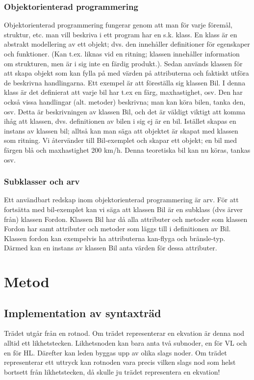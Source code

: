 \documentclass[12pt,a4paper]{article}
\begin{document}
\subsubsection{Objektorienterad programmering}
\label{subsubsection:oop}
Objektorienterad programmering fungerar genom att man för varje föremål, struktur, etc. man vill beskriva i ett program har en s.k. klass. En klass är en abstrakt modellering av ett objekt; dvs. den innehåller definitioner för egenskaper och funktioner. (Kan t.ex. liknas vid en ritning; klassen innehåller information om strukturen, men är i sig inte en färdig produkt.). Sedan används klassen för att skapa objekt som kan fylla på med värden på attributerna och faktiskt utföra de beskrivna handlingarna. Ett exempel är att föreställa sig klassen Bil. I denna klass är det definierat att varje bil har t.ex en färg, maxhastighet, osv. Den har också vissa handlingar (alt. metoder) beskrivna; man kan köra bilen, tanka den, osv. Detta är beskrivningen av klassen Bil, och det är väldigt viktigt att komma ihåg att klassen, dvs. definitionen av bilen i sig ej är en bil. Istället skapas en instans av klassen bil; alltså kan man säga att objektet är skapat med klassen som ritning. Vi återvänder till Bil-exemplet och skapar ett objekt; en bil med färgen blå och maxhastighet 200 km/h. Denna teoretiska bil kan nu köras, tankas osv.
\subsubsection{Subklasser och arv}
Ett användbart redskap inom objektorienterad programmering är arv. För att fortsätta med bil-exemplet kan vi säga att klassen Bil är en subklass (dvs ärver från) klassen Fordon. Klassen Bil har då alla attributer och metoder som klassen Fordon har samt attributer och metoder som läggs till i definitionen av Bil. Klassen fordon kan exempelvis ha attributerna kan-flyga och bränsle-typ. Därmed kan en instans av klassen Bil anta värden för dessa attributer.
\section{Metod}                                                                
\subsection{Implementation av syntaxträd}
Trädet utgår från en rotnod. Om trädet representerar en ekvation är denna nod alltid ett likhetstecken. Likhetsnoden kan bara anta två subnoder, en för VL och en för HL. Därefter kan leden byggas upp av olika slags noder. Om trädet representerar ett uttryck kan rotnoden vara precis vilken slags nod som helst bortsett från likhetstecken, då skulle ju trädet representera en ekvation!
\end{document}
